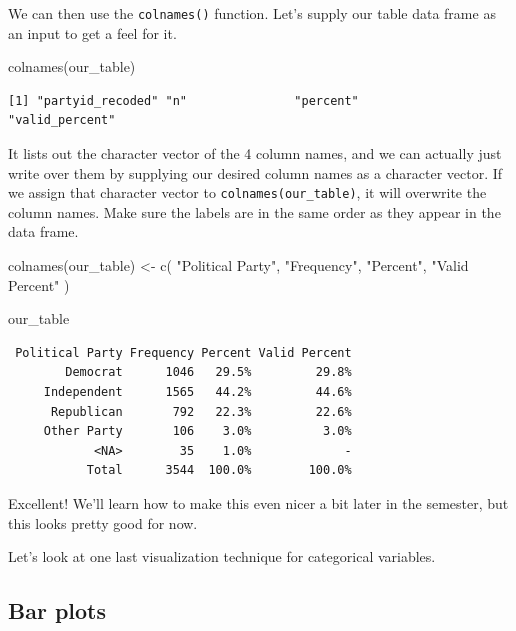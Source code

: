 \documentclass[
  letterpaper,
  DIV=11,
  numbers=noendperiod]{scrreprt}
\newenvironment{Shaded}{\begin{snugshade}}{\end{snugshade}}
\newcommand{\FunctionTok}[1]{\textcolor[rgb]{0.28,0.35,0.67}{#1}}
\newcommand{\NormalTok}[1]{\textcolor[rgb]{0.00,0.23,0.31}{#1}}
\newcommand{\OtherTok}[1]{\textcolor[rgb]{0.00,0.23,0.31}{#1}}
\newcommand{\StringTok}[1]{\textcolor[rgb]{0.13,0.47,0.30}{#1}}
\begin{document}
We can then use the \texttt{colnames()} function. Let's supply our table
data frame as an input to get a feel for it.

\begin{Shaded}
\begin{Highlighting}[]
\FunctionTok{colnames}\NormalTok{(our\_table)}
\end{Highlighting}
\end{Shaded}

\begin{verbatim}
[1] "partyid_recoded" "n"               "percent"         "valid_percent"  
\end{verbatim}

It lists out the character vector of the 4 column names, and we can
actually just write over them by supplying our desired column names as a
character vector. If we assign that character vector to
\texttt{colnames(our\_table)}, it will overwrite the column names. Make
sure the labels are in the same order as they appear in the data frame.

\begin{Shaded}
\begin{Highlighting}[]
\FunctionTok{colnames}\NormalTok{(our\_table) }\OtherTok{\textless{}{-}} \FunctionTok{c}\NormalTok{(}
  \StringTok{"Political Party"}\NormalTok{,}
  \StringTok{"Frequency"}\NormalTok{,}
  \StringTok{"Percent"}\NormalTok{,}
  \StringTok{"Valid Percent"}
\NormalTok{  )}

\NormalTok{our\_table}
\end{Highlighting}
\end{Shaded}

\begin{verbatim}
 Political Party Frequency Percent Valid Percent
        Democrat      1046   29.5%         29.8%
     Independent      1565   44.2%         44.6%
      Republican       792   22.3%         22.6%
     Other Party       106    3.0%          3.0%
            <NA>        35    1.0%             -
           Total      3544  100.0%        100.0%
\end{verbatim}

Excellent! We'll learn how to make this even nicer a bit later in the
semester, but this looks pretty good for now.

Let's look at one last visualization technique for categorical
variables.

\subsection{Bar plots}\label{bar-plots}
\end{document}
